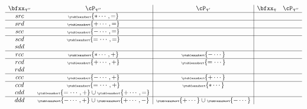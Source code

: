 \documentclass[12pt,a4paper]{amsart}
\numberwithin{equation}{section}
\theoremstyle{remark}
\let\ytb=\ytableaushort
\newcommand{\tytb}[1]{{\tiny\ytb{#1}}}
\def\uptaup{\uptau^{\prime}}
\def\uptaupp{\uptau^{\prime\prime}}
\begin{document}
\begin{equation} \label{eq:B1-2}
\begin{array}{cc|c|cc}
  \bfxx_{\uptaupp} & \cP_{\uptaupp}         & \cP_{\uptaup} & \bfxx_{\uptau} & \cP_{\uptaupp} \\
  \hline
  src              & \tytb{\ast\cdots ,=} &                                                 \\
  \hline
  srd              & \tytb{+\cdots,=}          &                                                 \\
  \hline
  scc              & \tytb{-\cdots,=}          &                                                 \\
  \hline
  scd              & \tytb{=\cdots,=} &                                                 \\
  sdd              & %
                                            &                                                 \\
  \hline
  rcc              & \tytb{\ast\cdots,+} & \tytb{-\cdots}                                                \\
  \hline
  rcd              & \tytb{+\cdots,+} & \tytb{=\cdots}                             \\
  rdd              & %
                                & \\
  \hline
  ccc              & \tytb{-\cdots,+}          & \tytb{+\cdots}                                               \\
  \hline
  ccd              & \tytb{=\cdots,+}          & \tytb{\ast\cdots}                                             \\
  cdd              & \tytb{=\cdots,+}\cup \tytb{+\cdots,=} & \\
  \hline
  ddd              & \tytb{-\cdots,+}\cup \tytb{+\cdots,-}  &
                                                            \tytb{+\cdots} \cup\tytb{-\cdots}                     \\
\end{array}
\end{equation}
\end{document}
